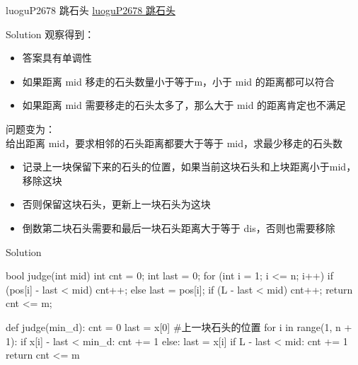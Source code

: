\documentclass[aspectratio=169,xcolor=dvipsnames]{beamer}
\begin{document}
\begin{frame}{luoguP2678 跳石头}
    \href{https://www.luogu.com.cn/problem/P2678}{luoguP2678 跳石头}
\end{frame}


\begin{frame}{Solution}
    观察得到：
    \begin{itemize}
        \item 答案具有单调性
        \item 如果距离 mid 移走的石头数量小于等于m，小于 mid 的距离都可以符合
        \item 如果距离 mid 需要移走的石头太多了，那么大于 mid 的距离肯定也不满足
    \end{itemize}
    \vspace*{2.5em}
    问题变为：\\
    给出距离 mid，要求相邻的石头距离都要大于等于 mid，求最少移走的石头数
    \begin{itemize}
        \item 记录上一块保留下来的石头的位置，如果当前这块石头和上块距离小于mid，移除这块
        \item 否则保留这块石头，更新上一块石头为这块
        \item 倒数第二块石头需要和最后一块石头距离大于等于 dis，否则也需要移除
    \end{itemize}
\end{frame}

\begin{frame}[fragile]{Solution}
\begin{minipage}{0.45\textwidth}
    \centering
    \begin{cppcode}
bool judge(int mid) {
    int cnt = 0;
    int last = 0;
    for (int i = 1; i <= n; i++) {
        if (pos[i] - last < mid)
            cnt++;
        else
            last = pos[i];
    }
    if (L - last < mid) cnt++;
    return cnt <= m;
}
    \end{cppcode}
\end{minipage}%
\hfill
\begin{minipage}{0.45\textwidth}
    \centering
    \begin{pycode}
def judge(min_d):
    cnt = 0
    last = x[0]  #上一块石头的位置
    for i in range(1, n + 1):
        if x[i] - last < min_d:
            cnt += 1
        else:
            last = x[i]
    if L - last < mid:
        cnt += 1
    return cnt <= m
    \end{pycode}
\end{minipage}
\end{frame}
\end{document}
